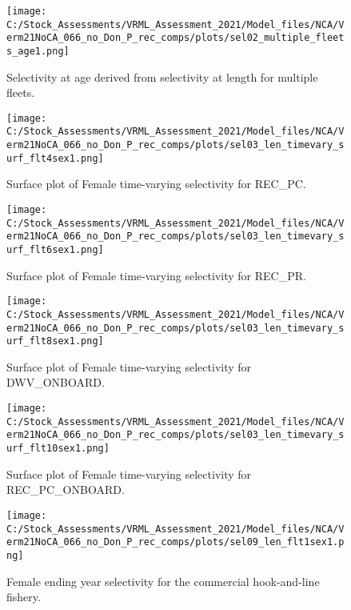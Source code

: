 \documentclass[11pt,
  english,
  a4paper,
]{article}
\begin{document}
\FloatBarrier

\begin{figure}
\centering
\texttt{[image: C:/Stock\_Assessments/VRML\_Assessment\_2021/Model\_files/NCA/Verm21NoCA\_066\_no\_Don\_P\_rec\_comps/plots/sel02\_multiple\_fleets\_age1.png]}
\caption{Selectivity at age derived from selectivity at length for multiple fleets.\label{fig:selex-age-all}}
\end{figure}

\begin{figure}
\centering
\texttt{[image: C:/Stock\_Assessments/VRML\_Assessment\_2021/Model\_files/NCA/Verm21NoCA\_066\_no\_Don\_P\_rec\_comps/plots/sel03\_len\_timevary\_surf\_flt4sex1.png]}
\caption{Surface plot of Female time-varying selectivity for REC\_PC.\label{fig:sel03_len_timevary_surf_flt4sex1}}
\end{figure}

\begin{figure}
\centering
\texttt{[image: C:/Stock\_Assessments/VRML\_Assessment\_2021/Model\_files/NCA/Verm21NoCA\_066\_no\_Don\_P\_rec\_comps/plots/sel03\_len\_timevary\_surf\_flt6sex1.png]}
\caption{Surface plot of Female time-varying selectivity for REC\_PR.\label{fig:sel03_len_timevary_surf_flt6sex1}}
\end{figure}

\begin{figure}
\centering
\texttt{[image: C:/Stock\_Assessments/VRML\_Assessment\_2021/Model\_files/NCA/Verm21NoCA\_066\_no\_Don\_P\_rec\_comps/plots/sel03\_len\_timevary\_surf\_flt8sex1.png]}
\caption{Surface plot of Female time-varying selectivity for DWV\_ONBOARD.\label{fig:sel03_len_timevary_surf_flt8sex1}}
\end{figure}

\begin{figure}
\centering
\texttt{[image: C:/Stock\_Assessments/VRML\_Assessment\_2021/Model\_files/NCA/Verm21NoCA\_066\_no\_Don\_P\_rec\_comps/plots/sel03\_len\_timevary\_surf\_flt10sex1.png]}
\caption{Surface plot of Female time-varying selectivity for REC\_PC\_ONBOARD.\label{fig:sel03_len_timevary_surf_flt10sex1}}
\end{figure}

\FloatBarrier

\FloatBarrier

\begin{figure}
\centering
\texttt{[image: C:/Stock\_Assessments/VRML\_Assessment\_2021/Model\_files/NCA/Verm21NoCA\_066\_no\_Don\_P\_rec\_comps/plots/sel09\_len\_flt1sex1.png]}
\caption{Female ending year selectivity for the commercial hook-and-line fishery.\label{fig:endyr-selex-COM-HKL}}
\end{figure}
\end{document}
